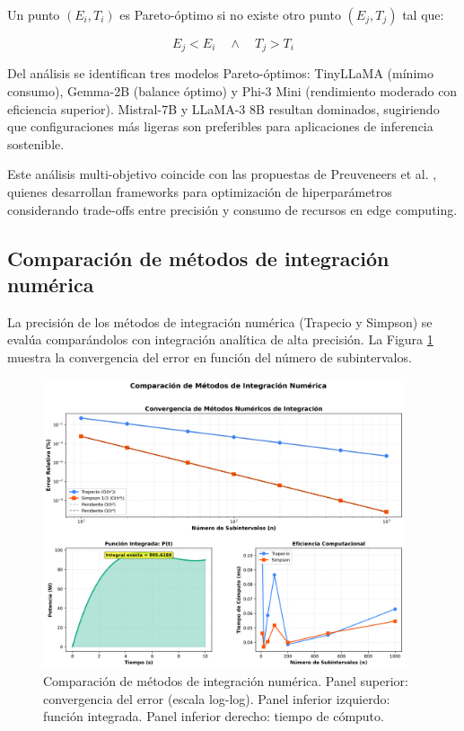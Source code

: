 Un punto $(E_i, T_i)$ es Pareto-óptimo si no existe otro punto $(E_j, T_j)$ tal que:

\begin{equation}
E_j < E_i \quad \land \quad T_j > T_i
\end{equation}

Del análisis se identifican tres modelos Pareto-óptimos: TinyLLaMA (mínimo consumo), Gemma-2B (balance óptimo) y Phi-3 Mini (rendimiento moderado con eficiencia superior). Mistral-7B y LLaMA-3 8B resultan dominados, sugiriendo que configuraciones más ligeras son preferibles para aplicaciones de inferencia sostenible.

Este análisis multi-objetivo coincide con las propuestas de Preuveneers et al. \cite{preuveneers2020resource}, quienes desarrollan frameworks para optimización de hiperparámetros considerando trade-offs entre precisión y consumo de recursos en edge computing.

\subsection{Comparación de métodos de integración numérica}

La precisión de los métodos de integración numérica (Trapecio y Simpson) se evalúa comparándolos con integración analítica de alta precisión. La Figura \ref{fig:metodos_numericos} muestra la convergencia del error en función del número de subintervalos.

\begin{figure}[H]
    \centering
    \includegraphics[width=0.95\textwidth]{figuras/png/grafico_5_comparacion_metodos_numericos.png}
    \caption{Comparación de métodos de integración numérica. Panel superior: convergencia del error (escala log-log). Panel inferior izquierdo: función integrada. Panel inferior derecho: tiempo de cómputo.}
    \label{fig:metodos_numericos}
\end{figure}

